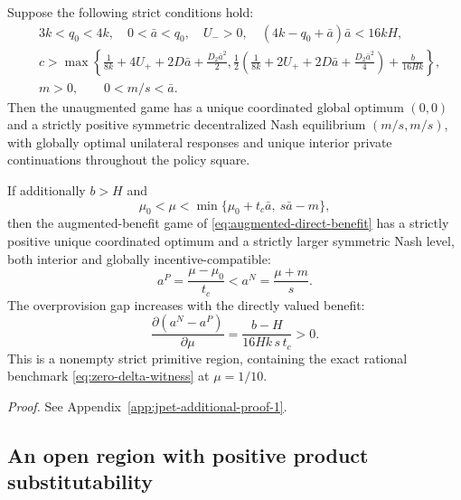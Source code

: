 \begin{proposition}
\label{prop:global-primitive-band}
Suppose the following strict conditions hold:
\begin{align}
&3k<q_0<4k,\quad 0<\bar a<q_0,\quad U_->0,\quad
(4k-q_0+\bar a)\bar a<16kH,
\label{eq:analytic-band-a}\\
&c>\max\left\{
\frac{1}{8k}+4U_++2D\bar a+\frac{D_2\bar a^2}{2},
\frac12\left(\frac1{8k}+2U_++2D\bar a+
\frac{D_2\bar a^2}{4}\right)+\frac{b}{16Hk}
\right\},
\label{eq:analytic-band-c}\\
&m>0,\qquad 0<m/s<\bar a.
\label{eq:analytic-band-d}
\end{align}
Then the unaugmented game has a unique coordinated global optimum
$(0,0)$ and a strictly positive symmetric decentralized Nash
equilibrium $(m/s,m/s)$, with globally optimal unilateral responses
and unique interior private continuations throughout the policy square.

If additionally $b>H$ and
\begin{equation}
\mu_0<\mu<
\min\{\mu_0+t_c\bar a,\ s\bar a-m\},
\label{eq:analytic-mu-range}
\end{equation}
then the augmented-benefit game of
\eqref{eq:augmented-direct-benefit} has a strictly positive unique
coordinated optimum and a strictly larger symmetric Nash level,
both interior and globally incentive-compatible:
\begin{equation}
a^P=\frac{\mu-\mu_0}{t_c}
<a^N=\frac{\mu+m}{s}.
\label{eq:analytic-policy-pair}
\end{equation}
The overprovision gap increases with the directly valued benefit:
\begin{equation}
\frac{\partial(a^N-a^P)}{\partial\mu}
=\frac{b-H}{16Hk\,s\,t_c}>0.
\label{eq:analytic-gap-slope}
\end{equation}
This is a nonempty strict primitive region, containing the exact
rational benchmark \eqref{eq:zero-delta-witness} at $\mu=1/10$.
\end{proposition}

\noindent\emph{Proof.} See Appendix~\ref{app:jpet-additional-proof-1}.


\subsection{An open region with positive product substitutability}

